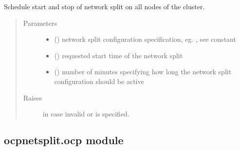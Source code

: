\documentclass[letterpaper,10pt,english]{sphinxmanual}
\begin{document}

\begin{fulllineitems}
\label{\detokenize{ocpnetsplit:ocpnetsplit.main.schedule_split}}
Schedule start and stop of network split on all nodes of the cluster.
\begin{quote}\begin{description}
\item[{Parameters}] \leavevmode\begin{itemize}
\item {} 
 () \textendash{} network split configuration specification, eg.
, see
{\hyperref[\detokenize{ocpnetsplit:ocpnetsplit.zone.NETWORK_SPLITS}]{}} constant

\item {} 
 () \textendash{} requested start time of the network split

\item {} 
 () \textendash{} number of minutes specifying how long the network
split configuration should be active

\end{itemize}

\item[{Raises}] \leavevmode
{} \textendash{} in case invalid  or  is
    specified.

\end{description}\end{quote}

\end{fulllineitems}



\subsection{ocpnetsplit.ocp module}
\label{\detokenize{ocpnetsplit:module-ocpnetsplit.ocp}}\label{\detokenize{ocpnetsplit:ocpnetsplit-ocp-module}}
\end{document}
